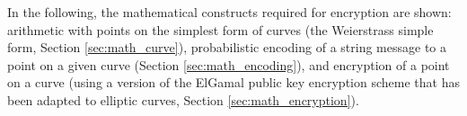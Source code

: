 In the following, the mathematical constructs required for encryption are shown: arithmetic with points on the simplest
form of curves (the Weierstrass simple form, Section \ref{sec:math_curve}), probabilistic encoding of a string message
to a point on a given curve (Section \ref{sec:math_encoding}), and encryption of a point on a curve (using a version
of the ElGamal public key encryption scheme that has been adapted to elliptic curves, Section \ref{sec:math_encryption}).



